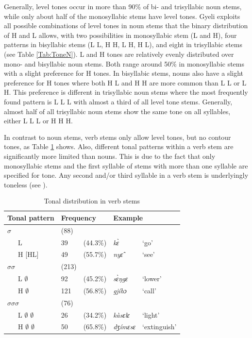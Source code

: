 Generally, level tones occur in more than 90\% of bi- and trisyllabic noun stems, while only about half of the monosyllabic stems have level tones.
Gyeli exploits all possible combinations of level tones in noun stems that the binary distribution of H and L allows, with two possibilities in monosyllabic stem (L and H), four patterns in bisyllabic stems (L L, H H,  L H, H L), and eight in trisyllabic stems (see Table \ref{Tab:ToneN}). L and H tones are relatively evenly distributed over mono- and bisyllabic noun stems. Both range around 50\% in monosyllabic stems with a slight preference for H tones. In bisyllabic stems, nouns also have a slight preference for H tones where both H L and H H are more common than L L or L H. This preference is different in trisyllabic noun stems where the most frequently found pattern is L L L with almost a third of all level tone stems. Generally, almost half of all trisyllabic noun stems show the same tone on all syllables, either L L L or H H H.

In contrast to noun stems, verb stems only allow level tones, but no contour tones, as Table \ref{Tab:ToneV} shows. Also, different tonal patterns within a verb stem are significantly more limited than nouns. This is due to the fact that  only monosyllabic stems and the first syllable of stems with more than one syllable are specified for tone. Any second and/or third syllable in a verb stem is underlyingly toneless (see ).

\begin{table} 
\centering
\begin{tabular}{ll|ll|ll}
\multicolumn{2}{l|}{Tonal pattern} & \multicolumn{2}{l|}{Frequency} & \multicolumn{2}{l}{Example} \\  \midrule
 \multicolumn{2}{l|}{$\sigma$} &  (88) &    & & \\
 & L & 39 & (44.3\%) & {\itshape kɛ̀} & `go' \\
 & H [HL] & 49 & (55.7\%) & {\itshape nyɛ̂} & `see'  \\
 \midrule
 \multicolumn{2}{l|}{$\sigma$$\sigma$} & (213) &  & &  \\
 &  L $\emptyset$ &  92 &   (45.2\%) & {\itshape sɛ̀ŋgɛ} & `lower' \\
 & H $\emptyset$ &  121  &  (56.8\%) & {\itshape gjíbɔ} & `call' \\
 \midrule
 \multicolumn{2}{l|}{$\sigma$$\sigma$$\sigma$} & (76) &  & &  \\
 & L $\emptyset$ $\emptyset$ &  26  &  (34.2\%) & {\itshape kàsɛlɛ} & `light' \\
& H $\emptyset$ $\emptyset$ & 50  &  (65.8\%) & {\itshape dʒímɛsɛ} & `extinguish'  \\  \midrule
\end{tabular}
\caption{Tonal distribution in verb stems}
\label{Tab:ToneV}
\end{table} 

